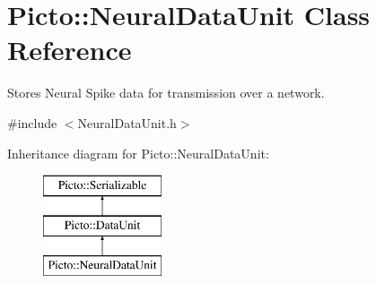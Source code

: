 \hypertarget{class_picto_1_1_neural_data_unit}{\section{Picto\-:\-:Neural\-Data\-Unit Class Reference}
\label{class_picto_1_1_neural_data_unit}
}


Stores Neural Spike data for transmission over a network.  




{\ttfamily \#include $<$Neural\-Data\-Unit.\-h$>$}

Inheritance diagram for Picto\-:\-:Neural\-Data\-Unit\-:\begin{figure}[H]
\begin{center}
\leavevmode
\includegraphics[height=3.000000cm]{class_picto_1_1_neural_data_unit}
\end{center}
\end{figure}
